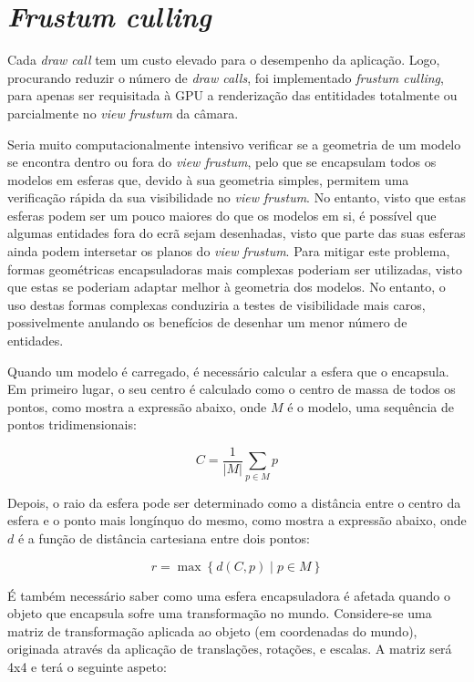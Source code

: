 \documentclass[12pt, a4paper]{article}
\begin{document}
\section{\emph{Frustum culling}}

Cada \emph{draw call} tem um custo elevado para o desempenho da aplicação. Logo, procurando reduzir
o número de \emph{draw calls}, foi implementado \emph{frustum culling}, para apenas ser requisitada
à GPU a renderização das entitidades totalmente ou parcialmente no \emph{view frustum} da câmara.

Seria muito computacionalmente intensivo verificar se a geometria de um modelo se encontra dentro ou
fora do \emph{view frustum}, pelo que se encapsulam todos os modelos em esferas que, devido à sua
geometria simples, permitem uma verificação rápida da sua visibilidade no \emph{view frustum}. No
entanto, visto que estas esferas podem ser um pouco maiores do que os modelos em si, é possível que
algumas entidades fora do ecrã sejam desenhadas, visto que parte das suas esferas ainda podem
intersetar os planos do \emph{view frustum}. Para mitigar este problema, formas geométricas
encapsuladoras mais complexas poderiam ser utilizadas, visto que estas se poderiam adaptar melhor à
geometria dos modelos. No entanto, o uso destas formas complexas conduziria a testes de visibilidade
mais caros, possivelmente anulando os benefícios de desenhar um menor número de entidades.

Quando um modelo é carregado, é necessário calcular a esfera que o encapsula. Em primeiro lugar, o
seu centro é calculado como o centro de massa de todos os pontos, como mostra a expressão abaixo,
onde $M$ é o modelo, uma sequência de pontos tridimensionais:

$$
C = \frac{1}{|M|} \sum_{p \in M} p
$$

Depois, o raio da esfera pode ser determinado como a distância entre o centro da esfera e o ponto
mais longínquo do mesmo, como mostra a expressão abaixo, onde $d$ é a função de distância cartesiana
entre dois pontos:

$$
r = \max \left \lbrace d(C, p) \mid p \in M \right \rbrace
$$

É também necessário saber como uma esfera encapsuladora é afetada quando o objeto que encapsula
sofre uma transformação no mundo. Considere-se uma matriz de transformação aplicada ao objeto (em
coordenadas do mundo), originada através da aplicação de translações, rotações, e escalas. A matriz
será 4x4 e terá o seguinte aspeto:
\end{document}
